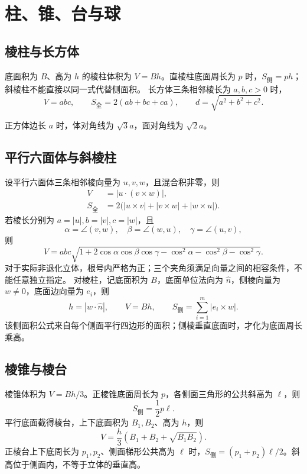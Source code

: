 \documentclass[../main.tex]{subfiles}
\begin{document}
\section{柱、锥、台与球}
\subsection{棱柱与长方体}
底面积为 $B$、高为 $h$ 的棱柱体积为 $V=Bh$。直棱柱底面周长为 $p$ 时，$S_{\text{侧}}=ph$；斜棱柱不能直接以同一式代替侧面积。
长方体三条相邻棱长为 $a,b,c>0$ 时，
\[
V=abc,\qquad S_{\text{全}}=2(ab+bc+ca),\qquad d=\sqrt{a^2+b^2+c^2}.
\]
\begin{center}
\end{center}
正方体边长 $a$ 时，体对角线为 $\sqrt3a$，面对角线为 $\sqrt2a$。
\subsection{平行六面体与斜棱柱}
设平行六面体三条相邻棱向量为 $u,v,w$，且混合积非零，则
\begin{align*}
V&=|u\cdot(v\times w)|,\\
S_{\text{全}}&=2\bigl(|u\times v|+|v\times w|+|w\times u|\bigr).
\end{align*}
若棱长分别为 $a=|u|,b=|v|,c=|w|$，且
\[
\alpha=\angle(v,w),\quad\beta=\angle(w,u),\quad\gamma=\angle(u,v),
\]
则
\[
V=abc\sqrt{1+2\cos\alpha\cos\beta\cos\gamma
-\cos^2\alpha-\cos^2\beta-\cos^2\gamma}.
\]
对于实际非退化立体，根号内严格为正；三个夹角须满足向量之间的相容条件，不能任意独立指定。
对棱柱，记底面积为 $B$，底面单位法向为 $\widehat n$，侧棱向量为 $w\ne0$，底面边向量为 $e_i$，则
\[
h=|w\cdot\widehat n|,\qquad V=Bh,\qquad
S_{\text{侧}}=\sum_{i=1}^m|e_i\times w|.
\]
该侧面积公式来自每个侧面平行四边形的面积；侧棱垂直底面时，才化为底面周长乘高。
\subsection{棱锥与棱台}
棱锥体积为 $V=Bh/3$。正棱锥底面周长为 $p$，各侧面三角形的公共斜高为 $\ell$，则
\[
S_{\text{侧}}=\frac12p\ell.
\]
平行底面截得棱台，上下底面积为 $B_1,B_2$、高为 $h$，则
\[
V=\frac h3(B_1+B_2+\sqrt{B_1B_2}).
\]
正棱台上下底周长为 $p_1,p_2$、侧面梯形公共高为 $\ell$ 时，$S_{\text{侧}}=(p_1+p_2)\ell/2$。斜高位于侧面内，不等于立体的垂直高。
\end{document}
